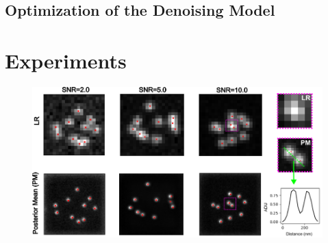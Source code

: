 \documentclass{article}
\begin{document}
\subsection{Optimization of the Denoising Model}

\section{Experiments}


\begin{figure}
\includegraphics[scale=0.6]{Samples.png}
\end{figure}
\end{document}
